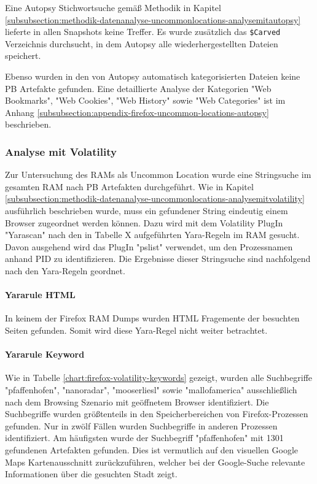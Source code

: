 Eine Autopsy Stichwortsuche gemäß Methodik in Kapitel \ref{subsubsection:methodik-datenanalyse-uncommonlocations-analysemitautopsy} lieferte in allen Snapshots keine Treffer. Es wurde zusätzlich das \texttt{\$Carved} Verzeichnis durchsucht, in dem Autopsy alle wiederhergestellten Dateien speichert.

Ebenso wurden in den von Autopsy automatisch kategorisierten Dateien keine PB Artefakte gefunden. Eine detaillierte Analyse der Kategorien "Web Bookmarks", "Web Cookies", "Web History" sowie "Web Categories" ist im Anhang \ref{subsubsection:appendix-firefox-uncommon-locations-autopsy} beschrieben.

\subsubsection*{Analyse mit Volatility}
\label{subsubsection:ergebnisse-firefox-uncommonlocations-analysemitvolatility}
Zur Untersuchung des RAMs als Uncommon Location wurde eine Stringsuche im gesamten RAM nach PB Artefakten durchgeführt.
Wie in Kapitel \ref{subsubsection:methodik-datenanalyse-uncommonlocations-analysemitvolatility} ausführlich beschrieben wurde, muss ein gefundener String eindeutig einem Browser zugeordnet werden können. 
Dazu wird mit dem Volatility PlugIn "Yarascan" nach den in Tabelle X aufgeführten Yara-Regeln im RAM gesucht. Davon ausgehend wird das PlugIn "pslist" verwendet, um den Prozessnamen anhand PID zu identifizieren.
Die Ergebnisse dieser Stringsuche sind nachfolgend nach den Yara-Regeln geordnet.

\paragraph*{Yararule HTML}
In keinem der Firefox RAM Dumps wurden HTML Fragemente der besuchten Seiten gefunden. Somit wird diese Yara-Regel nicht weiter betrachtet.

\paragraph*{Yararule Keyword}
Wie in Tabelle \ref{chart:firefox-volatility-keywords} gezeigt, wurden alle Suchbegriffe "pfaffenhofen", "nanoradar", "mooserliesl" sowie "mallofamerica" ausschließlich nach dem Browsing Szenario mit geöffnetem Browser identifiziert. Die Suchbegriffe wurden größtenteils in den Speicherbereichen von Firefox-Prozessen gefunden. Nur in zwölf Fällen wurden Suchbegriffe in anderen Prozessen identifiziert. Am häufigsten wurde der Suchbegriff "pfaffenhofen" mit 1301 gefundenen Artefakten gefunden. Dies ist vermutlich auf den  visuellen Google Maps Kartenausschnitt zurückzuführen, welcher bei der Google-Suche relevante Informationen über die gesuchten Stadt zeigt. 

